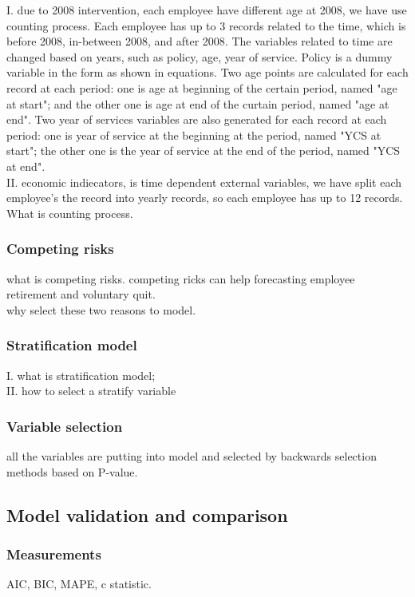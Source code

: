 \documentclass[12pt,letterpaper]{article}
\begin{document}
    I. due to 2008 intervention, each employee have different age at 2008, we have use counting process. Each employee has up to 3 records related to the time, which is before 2008, in-between 2008, and after 2008. The variables related to time are changed based on years, such as policy, age, year of service. Policy is a dummy variable in the form as shown in equations. 
    Two age points are calculated for each record at each period: one is age at beginning of the certain period, named "age at start"; and the other one is age at end of the curtain period, named "age at end".
    Two year of services variables are also generated for each record at each period: one is year of service at the beginning at the period, named "YCS at start"; the other one is the year of service at the end of the period, named "YCS at end".\\
    II. economic indiecators, is time dependent external variables, we have split each employee's the record into yearly records, so each employee has up to 12 records.  
    What is counting process.   \\ 

\subsubsection{Competing risks}
  what is competing risks. competing ricks can help forecasting employee retirement and voluntary quit. \\
  why select these two reasons to model.\\
\subsubsection{Stratification model}
  I. what is stratification model;\\
  II. how to select a stratify variable\\
\subsubsection{Variable selection}
 all the variables are putting into model and selected by backwards selection methods based on P-value.\\
\subsection{Model validation and comparison}
\subsubsection{Measurements}
 AIC, BIC, MAPE, c statistic.\\
\end{document}
